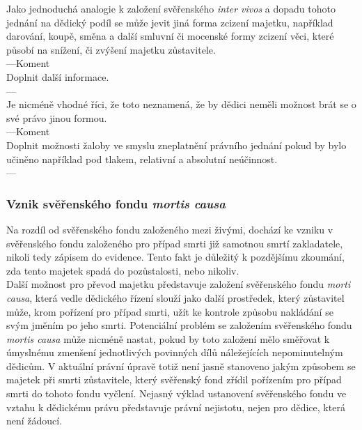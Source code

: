 \documentclass{article}
\begin{document}


Jako jednoduchá analogie k založení svěřenského \textit{inter vivos} a dopadu tohoto jednání na dědický podíl se může jevit jiná forma zcizení majetku, například darování, koupě, směna a další smluvní či mocenské formy zcizení věci, které působí na snížení, či zvýšení majetku zůstavitele. \\

---Koment\\
Doplnit další informace.\\
---\\
Je nicméně vhodné říci, že toto neznamená, že by dědici neměli možnost brát se o své právo jinou formou.\\
---Koment\\
Doplnit možnosti žaloby ve smyslu zneplatnění právního jednání pokud by bylo učiněno například pod tlakem, relativní a absolutní neúčinnost.\\
---\\

\newpage
\thispagestyle{smallertextinheader}

\subsubsection{Vznik svěřenského fondu \textit{mortis causa}}

Na rozdíl od svěřenského fondu založeného mezi živými, dochází ke vzniku v svěřenského fondu založeného pro případ smrti již samotnou smrtí zakladatele, nikoli tedy zápisem do evidence. Tento fakt je důležitý k pozdějšímu zkoumání, zda tento majetek spadá do pozůstalosti, nebo nikoliv.\\

Další možnost pro převod majetku představuje založení svěřenského fondu \textit{morti causa}, která vedle dědického řízení slouží jako další prostředek, který zůstavitel může, krom pořízení pro případ smrti, užít ke kontrole způsobu nakládání se svým jměním po jeho smrti. Potenciální problém se založením svěřenského fondu \textit{mortis causa} může nicméně nastat, pokud by toto založení mělo směřovat k úmyslnému zmenšení jednotlivých povinných dílů náležejících nepominutelným dědicům. V aktuální právní úpravě totiž není jasně stanoveno jakým způsobem se majetek při smrti zůstavitele, který svěřenský fond zřídil pořízením pro případ smrti do tohoto fondu vyčlení. Nejasný výklad ustanovení svěřenského fondu ve vztahu k dědickému právu představuje právní nejistotu, nejen pro dědice, která není žádoucí. \\
\end{document}
